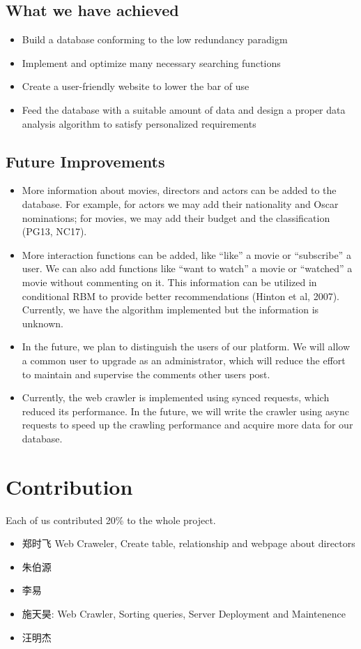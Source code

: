 \begin{CJK*}{UTF8}{gbsn}
\subsection{What we have achieved}
\begin{itemize}
\item Build a database conforming to the low redundancy paradigm
\item Implement and optimize many necessary  searching functions
\item Create a user-friendly website to lower the bar of use
\item Feed the database with a suitable amount of data and design a proper data analysis algorithm to satisfy personalized requirements
\end{itemize}
\subsection{Future Improvements}
\begin{itemize}
\item More information about movies, directors and actors can be added to the database. For example, for actors we may add their nationality and Oscar nominations; for movies, we may add their budget and the classification (PG13, NC17).
\item More interaction functions can be added, like ``like'' a movie or ``subscribe'' a user. We can also add functions like ``want to watch'' a movie or ``watched'' a movie without commenting on it. This information can be utilized in conditional RBM to provide better recommendations (Hinton et al, 2007). Currently, we have the algorithm implemented but the information is unknown. 
\item In the future, we plan to distinguish the users of our platform. We will allow a common user to upgrade as an administrator, which will reduce the effort to maintain and supervise the comments other users post.
\item Currently, the web crawler is implemented using synced requests, which reduced its performance. In the future, we will write the crawler using async requests to speed up the crawling performance and acquire more data for our database.
\end{itemize}

\section{Contribution}
Each of us contributed 20\% to the whole project.
\begin{itemize}
    \item 郑时飞 Web Craweler, Create table, relationship and webpage about directors
    \item 朱伯源
    \item 李易
    \item 施天昊:    Web Crawler, Sorting queries, Server Deployment and Maintenence
    \item 汪明杰
\end{itemize}

\end{CJK*}
